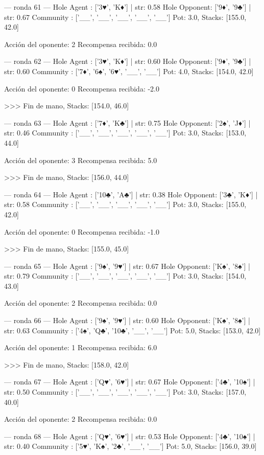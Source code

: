 --- ronda 61 ---
Hole Agent : ['3♥', 'K♦'] | str: 0.58
Hole Opponent: ['9♦', '9♣'] | str: 0.67
Community  : ['__', '__', '__', '__', '__']
Pot: 3.0, Stacks: [155.0, 42.0]

Acción del oponente: 2
Recompensa recibida: 0.0

--- ronda 62 ---
Hole Agent : ['3♥', 'K♦'] | str: 0.60
Hole Opponent: ['9♦', '9♣'] | str: 0.60
Community  : ['7♦', '6♠', '6♥', '__', '__']
Pot: 4.0, Stacks: [154.0, 42.0]

Acción del oponente: 0
Recompensa recibida: -2.0

>>> Fin de mano, Stacks: [154.0, 46.0]


--- ronda 63 ---
Hole Agent : ['7♦', 'K♣'] | str: 0.75
Hole Opponent: ['2♠', 'J♦'] | str: 0.46
Community  : ['__', '__', '__', '__', '__']
Pot: 3.0, Stacks: [153.0, 44.0]

Acción del oponente: 3
Recompensa recibida: 5.0

>>> Fin de mano, Stacks: [156.0, 44.0]


--- ronda 64 ---
Hole Agent : ['10♣', 'A♣'] | str: 0.38
Hole Opponent: ['3♣', 'K♦'] | str: 0.58
Community  : ['__', '__', '__', '__', '__']
Pot: 3.0, Stacks: [155.0, 42.0]

Acción del oponente: 0
Recompensa recibida: -1.0

>>> Fin de mano, Stacks: [155.0, 45.0]


--- ronda 65 ---
Hole Agent : ['9♠', '9♥'] | str: 0.67
Hole Opponent: ['K♠', '8♠'] | str: 0.79
Community  : ['__', '__', '__', '__', '__']
Pot: 3.0, Stacks: [154.0, 43.0]

Acción del oponente: 2
Recompensa recibida: 0.0

--- ronda 66 ---
Hole Agent : ['9♠', '9♥'] | str: 0.60
Hole Opponent: ['K♠', '8♠'] | str: 0.63
Community  : ['4♠', 'Q♣', '10♣', '__', '__']
Pot: 5.0, Stacks: [153.0, 42.0]

Acción del oponente: 1
Recompensa recibida: 6.0

>>> Fin de mano, Stacks: [158.0, 42.0]


--- ronda 67 ---
Hole Agent : ['Q♥', '6♥'] | str: 0.67
Hole Opponent: ['4♣', '10♠'] | str: 0.50
Community  : ['__', '__', '__', '__', '__']
Pot: 3.0, Stacks: [157.0, 40.0]

Acción del oponente: 2
Recompensa recibida: 0.0

--- ronda 68 ---
Hole Agent : ['Q♥', '6♥'] | str: 0.53
Hole Opponent: ['4♣', '10♠'] | str: 0.40
Community  : ['5♥', 'K♠', '2♣', '__', '__']
Pot: 5.0, Stacks: [156.0, 39.0]


